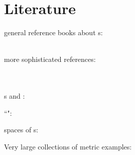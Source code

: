 \section{Literature}
\begin{survey}
\begin{liste}
  \item general reference books about s:
    \\ 
    \\ 

  \item more sophisticated references:
    \\
    \\
    \\\indentdr{}

  \item {}s and :\\

  \item ``":\\

  \item spaces of s:\\

  \item Very large collections of metric examples:\\
    \\
    \\

\end{liste}
\end{survey}

\fi